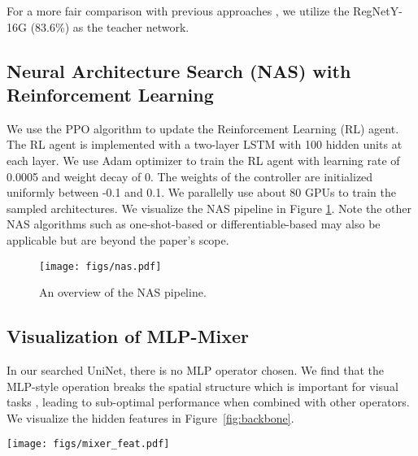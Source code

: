 \documentclass[runningheads]{llncs}
\begin{document}
For a more fair comparison with previous approaches \cite{alphanet,ofa,levit}, we utilize the RegNetY-16G (83.6\%) \cite{regnet} as the teacher network.

\subsection{Neural Architecture Search (NAS) with Reinforcement Learning}
We use the PPO \cite{ppo} algorithm to update the Reinforcement Learning (RL) agent. The RL agent is implemented with a two-layer LSTM with 100 hidden units at each layer. We use Adam \cite{adam} optimizer to train the RL agent with learning rate of 0.0005 and weight decay of 0. The weights of the controller are initialized uniformly between -0.1 and 0.1. We parallelly use about 80 GPUs to train the sampled architectures. We visualize the NAS pipeline in Figure \ref{fig:nas}. Note the other NAS algorithms such as one-shot-based \cite{ofa} or differentiable-based \cite{Liu2019DARTSDA} may also be applicable but are beyond the paper's scope.

\begin{figure}[h]
    \centering
    \texttt{[image: figs/nas.pdf]}
    \caption{An overview of the NAS pipeline.}
    \label{fig:nas}
\end{figure}



\subsection{Visualization of MLP-Mixer}
In our searched UniNet, there is no MLP operator chosen. We find that the MLP-style operation breaks the spatial structure which is important for visual tasks \cite{islam2020much}, leading to sub-optimal performance when combined with other operators. We visualize the hidden features in Figure~\ref{fig:backbone}.

\begin{figure*}[t]
    \centering
    \texttt{[image: figs/mixer\_feat.pdf]}
    \caption{Hidden features of MLP-Mixer \cite{mixer}. Hidden features are reshaped back to 2D dimension.}
    \label{fig:backbone}
\end{figure*}


\clearpage


\end{document}
